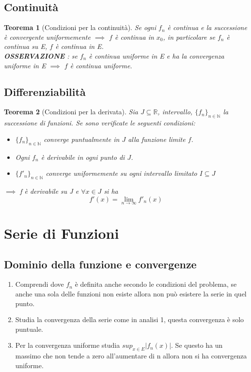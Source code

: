 \documentclass[a4paper]{article}
\newcommand{\numberset}{\mathbb}
\newcommand{\N}{\numberset{N}}
\newcommand{\R}{\numberset{R}}
\theoremstyle{plain}
\newtheorem{Teo}{Teorema}
\begin{document}
\subsection{Continuità}

\begin{Teo} [Condizioni per la continuità] 
    Se ogni $f_n$ è continua e la successione è convergente uniformemente $\implies$ $f$ è continua 
    in $x_0$, in particolare se $f_n$ è continua su E, $f$ è continua in E.\\
    \textbf{OSSERVAZIONE} : se $f_n$ è continua uniforme in E e ha la convergenza uniforme in E
    $\implies$ $f$ è continua uniforme. 
\end{Teo}

\subsection{Differenziabilità}

\begin{Teo}[Condizioni per la derivata]
    Sia $J\subseteq\R$, intervallo, $\{f_n\}_{n\in\N}$ la successione di funzioni.
    Se sono verificate le seguenti condizioni:
    \begin{itemize}
        \item $\{f_n\}_{n\in\N}$ converge puntualmente in $J$ alla funzione limite $f$.
        \item Ogni $f_n$ è derivabile in ogni punto di $J$.
        \item $\{f'_n\}_{n\in\N}$ converge uniformemente su ogni intervallo limitato $I\subseteq J$
    \end{itemize}
    $\implies$ f è derivabile su J e $\forall x \in J$ si ha 
    \begin{equation*} 
        f'(x)=\lim_{n\to\infty}{f'_n(x)}
    \end{equation*} 

\end{Teo}

\section {Serie di Funzioni}

\subsection{Dominio della funzione e convergenze}

\begin{enumerate}
    \item Comprendi dove $f_n$ è definita anche secondo le condizioni del problema,
    se anche una sola delle funzioni non esiste allora non può esistere la serie in quel punto.
    \item Studia la convergenza della serie come in analisi 1, questa convergenza è solo puntuale.
    \item Per la convergenza uniforme studia $sup_{x\in E}{|f_n(x)|}$. Se questo ha un massimo
    che non tende a zero all'aumentare di n allora non si ha convergenza uniforme.
\end{enumerate}
\end{document}
